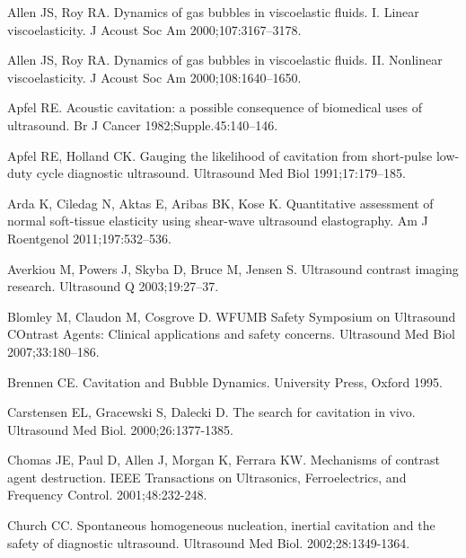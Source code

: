 \documentclass[%
preprint,%
author-year,%
]{jasatex}
\begin{document}
\begin{thebibliography}{00}

 Allen JS, Roy RA. Dynamics
  of gas bubbles in viscoelastic fluids. I. Linear viscoelasticity. J
  Acoust Soc Am 2000;107:3167--3178.

 Allen JS, Roy RA. Dynamics
  of gas bubbles in viscoelastic fluids. II. Nonlinear
  viscoelasticity. J Acoust Soc Am 2000;108:1640--1650.
  
  
 Apfel RE. Acoustic cavitation: a
  possible consequence of biomedical uses of ultrasound.  Br J Cancer
  1982;Supple.45:140--146.

 Apfel RE, Holland
  CK. Gauging the likelihood of cavitation from short-pulse low-duty
  cycle diagnostic ultrasound. Ultrasound Med Biol 1991;17:179--185.

 Arda K, Ciledag N, Aktas
  E, Aribas BK, Kose K. Quantitative assessment of normal soft-tissue
  elasticity using shear-wave ultrasound elastography. Am J Roentgenol
  2011;197:532--536.

 Averkiou M,
  Powers J, Skyba D, Bruce M, Jensen S. Ultrasound contrast imaging
  research. Ultrasound Q 2003;19:27--37.

 Blomley M, Claudon
  M, Cosgrove D. WFUMB Safety Symposium on Ultrasound COntrast Agents:
  Clinical applications and safety concerns. Ultrasound Med Biol
  2007;33:180--186.

 Brennen CE. Cavitation and Bubble
  Dynamics. University Press, Oxford 1995.

 Carstensen
  EL, Gracewski S, Dalecki D. The search for cavitation in
  vivo. Ultrasound Med Biol.  2000;26:1377-1385.

 Chomas JE, Paul D, Allen J, Morgan K, Ferrara KW. Mechanisms of contrast agent destruction. IEEE Transactions on Ultrasonics, Ferroelectrics, and Frequency Control.  2001;48:232-248.

 Church CC. Spontaneous homogeneous
  nucleation, inertial cavitation and the safety of diagnostic
  ultrasound. Ultrasound Med Biol. 2002;28:1349-1364.


\end{thebibliography}
\end{document}
